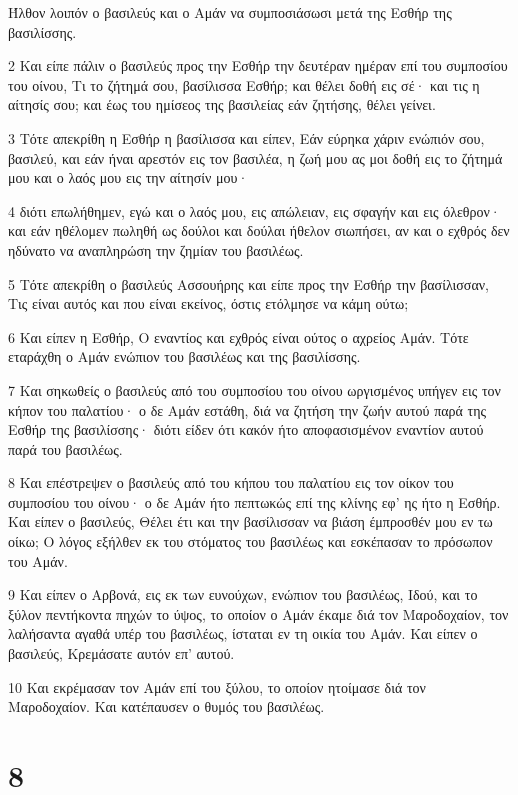 \par Ήλθον λοιπόν ο βασιλεύς και ο Αμάν να συμποσιάσωσι μετά της Εσθήρ της βασιλίσσης.
\par 2 Και είπε πάλιν ο βασιλεύς προς την Εσθήρ την δευτέραν ημέραν επί του συμποσίου του οίνου, Τι το ζήτημά σου, βασίλισσα Εσθήρ; και θέλει δοθή εις σέ· και τις η αίτησίς σου; και έως του ημίσεος της βασιλείας εάν ζητήσης, θέλει γείνει.
\par 3 Τότε απεκρίθη η Εσθήρ η βασίλισσα και είπεν, Εάν εύρηκα χάριν ενώπιόν σου, βασιλεύ, και εάν ήναι αρεστόν εις τον βασιλέα, η ζωή μου ας μοι δοθή εις το ζήτημά μου και ο λαός μου εις την αίτησίν μου·
\par 4 διότι επωλήθημεν, εγώ και ο λαός μου, εις απώλειαν, εις σφαγήν και εις όλεθρον· και εάν ηθέλομεν πωληθή ως δούλοι και δούλαι ήθελον σιωπήσει, αν και ο εχθρός δεν ηδύνατο να αναπληρώση την ζημίαν του βασιλέως.
\par 5 Τότε απεκρίθη ο βασιλεύς Ασσουήρης και είπε προς την Εσθήρ την βασίλισσαν, Τις είναι αυτός και που είναι εκείνος, όστις ετόλμησε να κάμη ούτω;
\par 6 Και είπεν η Εσθήρ, Ο εναντίος και εχθρός είναι ούτος ο αχρείος Αμάν. Τότε εταράχθη ο Αμάν ενώπιον του βασιλέως και της βασιλίσσης.
\par 7 Και σηκωθείς ο βασιλεύς από του συμποσίου του οίνου ωργισμένος υπήγεν εις τον κήπον του παλατίου· ο δε Αμάν εστάθη, διά να ζητήση την ζωήν αυτού παρά της Εσθήρ της βασιλίσσης· διότι είδεν ότι κακόν ήτο αποφασισμένον εναντίον αυτού παρά του βασιλέως.
\par 8 Και επέστρεψεν ο βασιλεύς από του κήπου του παλατίου εις τον οίκον του συμποσίου του οίνου· ο δε Αμάν ήτο πεπτωκώς επί της κλίνης εφ' ης ήτο η Εσθήρ. Και είπεν ο βασιλεύς, Θέλει έτι και την βασίλισσαν να βιάση έμπροσθέν μου εν τω οίκω; Ο λόγος εξήλθεν εκ του στόματος του βασιλέως και εσκέπασαν το πρόσωπον του Αμάν.
\par 9 Και είπεν ο Αρβονά, εις εκ των ευνούχων, ενώπιον του βασιλέως, Ιδού, και το ξύλον πεντήκοντα πηχών το ύψος, το οποίον ο Αμάν έκαμε διά τον Μαροδοχαίον, τον λαλήσαντα αγαθά υπέρ του βασιλέως, ίσταται εν τη οικία του Αμάν. Και είπεν ο βασιλεύς, Κρεμάσατε αυτόν επ' αυτού.
\par 10 Και εκρέμασαν τον Αμάν επί του ξύλου, το οποίον ητοίμασε διά τον Μαροδοχαίον. Και κατέπαυσεν ο θυμός του βασιλέως.

\chapter{8}

